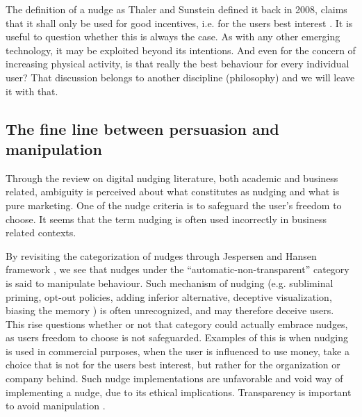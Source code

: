 The definition of a nudge as Thaler and Sunstein defined it back in 2008, claims that it shall only be used for good incentives, i.e. for the users best interest \cite{thaler_nudge-_2009}. It is useful to question whether this is always the case. As with any other emerging technology, it may be exploited beyond its intentions. And even for the concern of increasing physical activity, is that really the best behaviour for every individual user? That discussion belongs to another discipline (philosophy) and we will leave it with that. 

\subsection{The fine line between persuasion and manipulation}
Through the review on digital nudging literature, both academic and business related, ambiguity is perceived about what constitutes as nudging and what is pure marketing. One of the nudge criteria is to safeguard the user's freedom to choose. It seems that the term nudging is often used incorrectly in business related contexts. 

By revisiting the categorization of nudges through Jespersen and Hansen framework 
\cite{hansen_nudge_2013}, we see that nudges under the “automatic-non-transparent” category is said to manipulate behaviour. Such mechanism of nudging (e.g. subliminal priming, opt-out policies, adding inferior alternative, deceptive visualization, biasing the memory \cite{caraban_23_2019}) is often unrecognized, and may therefore deceive users. This rise questions whether or not that category could actually embrace nudges, as users freedom to choose is not safeguarded. Examples of this is when nudging is used in commercial purposes, when the user is influenced to use money, take a choice that is not for the users best interest, but rather for the organization or company behind. Such nudge implementations are unfavorable and void way of implementing a nudge, due to its ethical implications. Transparency is important to avoid manipulation \cite{karlsen_recommendations_2019}. 

